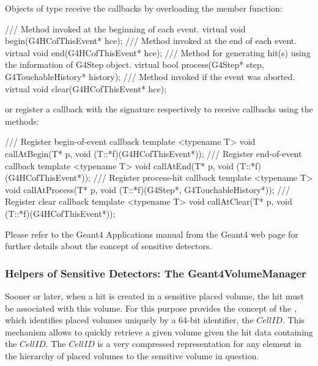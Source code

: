 \documentclass[10pt,a4paper]{article}
\begin{document}
\noindent
Objects of type  receive the callbacks by overloading the 
member function:
\begin{unnumberedcode}
  /// Method invoked at the beginning of each event.
  virtual void begin(G4HCofThisEvent* hce);
  /// Method invoked at the end of each event.
  virtual void end(G4HCofThisEvent* hce);
  /// Method for generating hit(s) using the information of G4Step object.
  virtual bool process(G4Step* step, G4TouchableHistory* history);
  /// Method invoked if the event was aborted.
  virtual void clear(G4HCofThisEvent* hce);
\end{unnumberedcode}
or register a callback with the signature {}
respectively {} 
to receive callbacks using the methods:
\begin{unnumberedcode}
  /// Register begin-of-event callback
  template <typename T> void callAtBegin(T* p, void (T::*f)(G4HCofThisEvent*));
  /// Register end-of-event callback
  template <typename T> void callAtEnd(T* p, void (T::*f)(G4HCofThisEvent*));
  /// Register process-hit callback
  template <typename T> void callAtProcess(T* p, void (T::*f)(G4Step*, G4TouchableHistory*));
  /// Register clear callback
  template <typename T> void callAtClear(T* p, void (T::*f)(G4HCofThisEvent*));
\end{unnumberedcode}
Please refer to the Geant4 Applications manual from the Geant4 web page for 
further details about the concept of sensitive detectors.

\subsubsection{Helpers of Sensitive Detectors: The Geant4VolumeManager}
\label{sec:ddg4-user-manual-geant4volumemanager}%

\noindent
Sooner or later, when a hit is created in a sensitive placed volume, the
hit must be associated with this volume. For this purpose \DDhep provides 
the concept of the , which identifies placed volumes uniquely 
by a 64-bit identifier, the $CellID$. This mechanism allows to quickly
retrieve a given volume given the hit data containing the $CellID$.
The $CellID$ is a very compressed representation for any element in the 
hierarchy of placed volumes to the sensitive volume in question.
\end{document}
